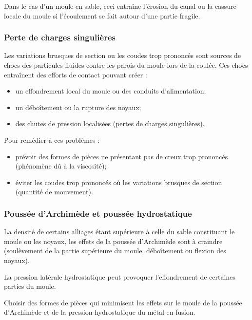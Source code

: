 \documentclass[11pt,oneside]{article}
\begin{document}
Dans le cas d'un moule en sable, ceci entraîne l'érosion du canal ou la cassure
locale du moule si l'écoulement se fait autour d'une partie fragile. 

\subsubsection{Perte de charges singulières}
Les variations brusques de section ou les coudes trop prononcés sont sources de
chocs des particules fluides contre les parois du moule lors de la coulée. Ces
chocs entraînent des efforts de contact pouvant créer : 
\begin{itemize}
 \item un effondrement local du moule ou des conduits d'alimentation;
\item un déboîtement ou la rupture des noyaux;
\item des chutes de pression localisées (pertes de charges singulières).
\end{itemize}

Pour remédier à ces problèmes : 
\begin{itemize}
 \item prévoir des formes de pièces ne présentant pas de creux trop prononcés
(phénomène dû à la viscosité);
\item éviter les coudes trop prononcés où les variations brusques de section
(quantité de mouvement).
\end{itemize}

\subsubsection{Poussée d'Archimède et poussée hydrostatique}
La densité de certains alliages étant supérieure à celle du sable constituant
le moule ou les noyaux, les effets de la poussée d'Archimède sont à craindre
(soulèvement de la partie supérieure du moule, déboîtement ou flexion des
noyaux).

La pression latérale hydrostatique peut provoquer l'effondrement de certaines
parties du moule. 

Choisir des formes de pièces qui minimisent les effets sur le moule de la
poussée d'Archimède et de la pression hydrostatique du métal en fusion.
\end{document}
